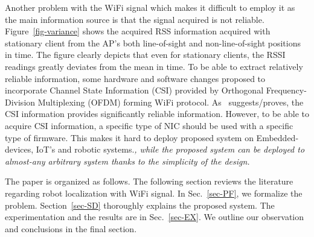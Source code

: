   Another problem with the WiFi signal which makes it difficult to employ it as the main information source is that the signal acquired is not reliable.
  Figure~\ref{fig-variance} shows the acquired RSS information acquired with stationary client from the AP's both line-of-sight and non-line-of-sight positions in time.
  The figure clearly depicts that even for stationary clients, the RSSI readings greatly deviates from the mean in time.
  To be able to extract relatively reliable information, some hardware and software changes proposed to incorporate Channel State Information (CSI) provided by Orthogonal Frequency-Division Multiplexing (OFDM) forming WiFi protocol.
  As~\cite{gao2015channel} suggests/proves, the CSI information provides significantly reliable information.
  However, to be able to acquire CSI information, a specific type of NIC should be used with a specific type of firmware.
  This makes it hard to deploy proposed system on Embedded-devices, IoT's and robotic systems.\textit{, while the proposed system can be deployed to almost-any arbitrary system thanks to the simplicity of the design.}


  The paper is organized as follows.
  The following section reviews the literature regarding robot localization with WiFi signal.
  In Sec.~\ref{sec-PF}, we formalize the problem.
  Section~\ref{sec-SD} thoroughly explains the proposed system.
  The experimentation and the results are  in Sec.~\ref{sec-EX}.
  We outline our observation and conclusions in the final section.
